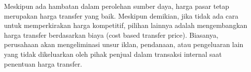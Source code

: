 \begin{spacing}{1.5}
\begin{enumerate}
	Meskipun ada hambatan dalam perolehan sumber daya, harga pasar tetap merupakan harga transfer yang baik. Meskipun demikian, jika tidak ada cara untuk memperkirakan harga kompetitif, pilihan lainnya adalah mengembangkan harga transfer berdasarkan biaya (cost based transfer price). Biasanya, perusahaan akan mengeliminasi unsur iklan, pendanaan, atau pengeluaran lain yang tidak dikeluarkan oleh pihak penjual dalam transaksi internal saat penentuan harga transfer.

\end{enumerate}



	




		 



\end{spacing}
